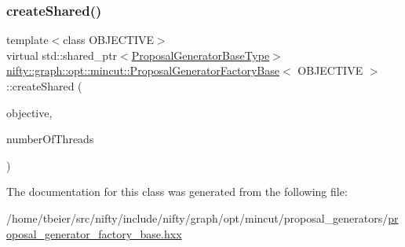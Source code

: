 \mbox{\label{classnifty_1_1graph_1_1opt_1_1mincut_1_1ProposalGeneratorFactoryBase_ae5a36d5232e166ce2eb3ddf11fd63197}} 
\subsubsection{\texorpdfstring{create\+Shared()}{createShared()}}
{\footnotesize\ttfamily template$<$class O\+B\+J\+E\+C\+T\+I\+VE$>$ \\
virtual std\+::shared\+\_\+ptr$<$\hyperlink{classnifty_1_1graph_1_1opt_1_1mincut_1_1ProposalGeneratorFactoryBase_a6c03cbefa18b1f47e337d700d774cd97}{Proposal\+Generator\+Base\+Type}$>$ \hyperlink{classnifty_1_1graph_1_1opt_1_1mincut_1_1ProposalGeneratorFactoryBase}{nifty\+::graph\+::opt\+::mincut\+::\+Proposal\+Generator\+Factory\+Base}$<$ O\+B\+J\+E\+C\+T\+I\+VE $>$\+::create\+Shared (\begin{DoxyParamCaption}\item[{const \hyperlink{classnifty_1_1graph_1_1opt_1_1mincut_1_1ProposalGeneratorFactoryBase_a51fcc2cc6c0db5a4d48609e0f9716f1b}{Objective\+Type} \&}]{objective,  }\item[{const size\+\_\+t}]{number\+Of\+Threads }\end{DoxyParamCaption})\hspace{0.3cm}{\ttfamily [pure virtual]}}



The documentation for this class was generated from the following file\+:\begin{DoxyCompactItemize}
\item 
/home/tbeier/src/nifty/include/nifty/graph/opt/mincut/proposal\+\_\+generators/\hyperlink{mincut_2proposal__generators_2proposal__generator__factory__base_8hxx}{proposal\+\_\+generator\+\_\+factory\+\_\+base.\+hxx}\end{DoxyCompactItemize}
